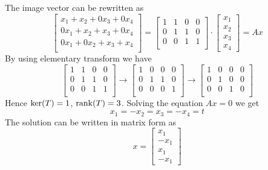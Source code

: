 \documentclass[11pt]{article}
\begin{document}
\begin{sol}
    The image vector can be rewritten as 
    \[
        \begin{bmatrix}
            x_1+x_2 + 0x_3 + 0x_4\\
            0x_1 + x_2 + x_3 + 0x_4\\
            0x_1 + 0x_2 + x_3 + x_4\\
        \end{bmatrix}
        = 
        \begin{bmatrix}
            1 & 1 & 0 &0\\
            0& 1 & 1 & 0\\
            0 & 0 & 1 & 1\\
        \end{bmatrix}
        \cdot
        \begin{bmatrix}
            x_1\\x_2\\x_3\\x_4
        \end{bmatrix}
        = Ax
    \]
    By using elementary transform we have 
    \[
                \begin{bmatrix}
            1 & 1 & 0 &0\\
            0& 1 & 1 & 0\\
            0 & 0 & 1 & 1\\
        \end{bmatrix} \to         
        \begin{bmatrix}
            1 & 0 & 0 &0\\
            0& 1 & 1 & 0\\
            0 & 0 & 0 & 1\\
        \end{bmatrix}
        \to 
        \begin{bmatrix}
            1 & 0 & 0 &0\\
            0& 1 & 0 & 0\\
            0 & 0 & 1 & 0\\
        \end{bmatrix}
    \]
    Hence $\mathrm{ker}(T) = 1$, $\mathrm{rank}(T) = 3$. Solving the equation $Ax = 0$ we get 
    \[
        x_1 = -x_2 = x_3 = -x_4 = t
    \]
    The solution can be written in matrix form as 
    \[
        x = \begin{bmatrix}
            x_1\\-x_1\\x_1\\-x_1
        \end{bmatrix}
\]
\end{sol}
\end{document}
